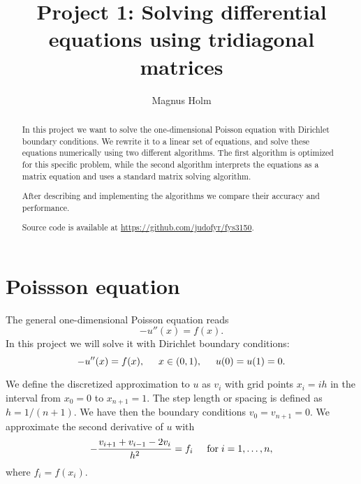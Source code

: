 \documentclass[a4paper]{article}
\title{Project 1: Solving differential equations using tridiagonal matrices}
\author{Magnus Holm}
\begin{document}
\maketitle

\begin{abstract}
  In this project we want to solve the one-dimensional Poisson equation with
  Dirichlet boundary conditions. We rewrite it to a linear set of equations,
  and solve these equations numerically using two different algorithms. The first
  algorithm is optimized for this specific problem, while the second algorithm
  interprets the equations as a matrix equation and uses a standard matrix
  solving algorithm.

  After describing and implementing the algorithms we compare their accuracy
  and performance.

  Source code is available at \url{https://github.com/judofyr/fys3150}.
\end{abstract}

\section{Poissson equation}

The general one-dimensional Poisson equation reads
\begin{equation*}
  -u''(x) = f(x).
\end{equation*}
In this project we will solve it with Dirichlet boundary conditions:
\begin{equation*}
  -u''(x) = f(x), \hspace{0.5cm}
  x \in (0, 1), \hspace{0.5cm}
  u(0) = u(1) = 0.
\end{equation*}

We define the discretized approximation  to $u$ as $v_i$  with 
grid points $x_i=ih$   in the interval from $x_0=0$ to $x_{n+1}=1$.
The step length or spacing is defined as $h=1/(n+1)$. 
We have then the boundary conditions $v_0 = v_{n+1} = 0$.
We  approximate the second
derivative of $u$ with 
\begin{equation*}
   -\frac{v_{i+1}+v_{i-1}-2v_i}{h^2} = f_i  \hspace{0.5cm} \mathrm{for} \hspace{0.1cm} i=1,\dots, n,
\end{equation*}
where $f_i=f(x_i)$.
\end{document}
